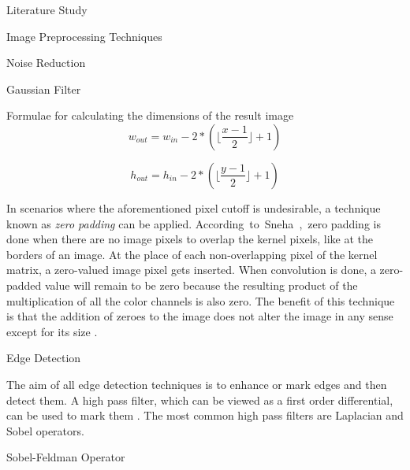 \documentclass{matthijs}
\begin{document}
\begin{hoofdstuk}{Literature Study}
\begin{paragraaf}{Image Preprocessing Techniques}
\begin{subparagraaf}{Noise Reduction}
\begin{subsubparagraaf}{Gaussian Filter}
					\begin{figuur}{Formulae for calculating the dimensions of the result image}
						\begin{equation*}
							w_{out} = w_{in} - 2 * (\lfloor\frac{x - 1}{2}\rfloor + 1)
						\end{equation*}

						\vspace{-4ex}
					
						\begin{equation*}
							h_{out} = h_{in} - 2 * (\lfloor\frac{y - 1}{2}\rfloor + 1)
						\end{equation*}
					\end{figuur}

					\bigskip

					In scenarios where the aforementioned pixel cutoff is undesirable, a technique known as \textit{zero padding} can be applied.
					\mbox{According to Sneha \cite{sneha2018convolution}, zero} padding is done when there are no image pixels to overlap the kernel pixels, like at the borders of an image.
					At the place of each non-overlapping pixel of the kernel matrix, a zero-valued image pixel gets inserted.
					When convolution is done, a zero-padded value will remain to be zero because the resulting product of the multiplication of all the color channels is also zero.
					The benefit of this technique is that the addition of zeroes to the image does not alter the image in any sense except for its size \cite{sneha2018convolution}.

				\end{subsubparagraaf}

			\end{subparagraaf}

			\begin{subparagraaf}{Edge Detection}

				The aim of all edge detection techniques is to enhance or mark edges and then detect them.
				A high pass filter, which can be viewed as a first order differential, can be used to mark them \cite{hossack2006edge}.
				The most common high pass filters are Laplacian and Sobel operators.

				\begin{subsubparagraaf}{Sobel-Feldman Operator}


\end{subsubparagraaf}
\end{subparagraaf}
\end{paragraaf}
\end{hoofdstuk}
\end{document}
